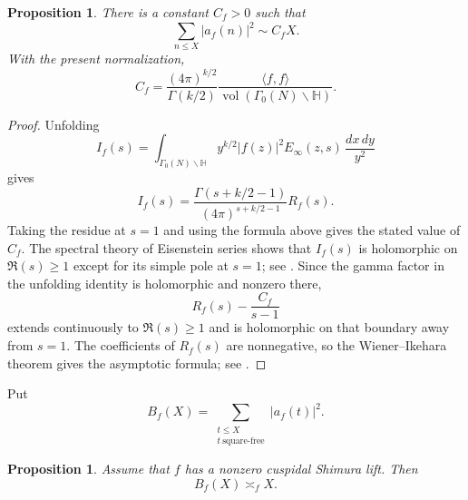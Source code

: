 \documentclass[11pt]{amsart}
\newtheorem{proposition}[theorem]{Proposition}
\theoremstyle{remark}
\newcommand{\Hh}{\mathbb H}
\newcommand{\vol}{\operatorname{vol}}
\begin{document}
\begin{proposition}\label{prop:all-second}
There is a constant $C_f>0$ such that
\[
\sum_{n\le X}|a_f(n)|^2\sim C_fX.
\]
With the present normalization,
\[
C_f=\frac{(4\pi)^{k/2}}{\Gamma(k/2)}
\frac{\langle f,f\rangle}{\vol(\Gamma_0(N)\backslash\Hh)}.
\]
\end{proposition}

\begin{proof}
Unfolding
\[
I_f(s)=\int_{\Gamma_0(N)\backslash\Hh}
y^{k/2}|f(z)|^2E_\infty(z,s)\,\frac{dx\,dy}{y^2}
\]
gives
\[
I_f(s)=\frac{\Gamma(s+k/2-1)}{(4\pi)^{s+k/2-1}}R_f(s).
\]
Taking the residue at $s=1$ and using the formula above gives the stated
value of $C_f$. The spectral theory of Eisenstein series shows that
$I_f(s)$ is holomorphic on $\Re(s)\geq1$ except for its simple pole at
$s=1$; see \cite[Chapter~6]{IwaniecSpectral}. Since the gamma factor in
the unfolding identity is holomorphic and nonzero there,
\[
R_f(s)-\frac{C_f}{s-1}
\]
extends continuously to $\Re(s)\geq1$ and is holomorphic on that boundary
away from $s=1$. The coefficients of $R_f(s)$ are nonnegative, so the
Wiener--Ikehara theorem gives the asymptotic formula; see
\cite[Chapter~II.7]{Tenenbaum}.
\end{proof}

Put
\[
B_f(X)=\sum_{\substack{t\le X\\t\ \mathrm{square\text{-}free}}}|a_f(t)|^2.
\]

\begin{proposition}\label{prop:squarefree-second}
Assume that $f$ has a nonzero cuspidal Shimura lift. Then
\[
B_f(X)\asymp_f X.
\]
\end{proposition}
\end{document}
